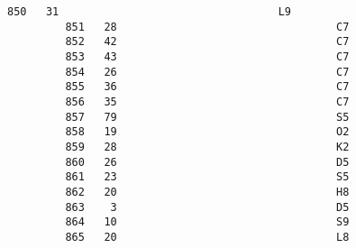 \documentclass[11pt]{article}
\begin{document}
\begin{Verbatim}[commandchars=\\\{\}]
         850   31                                  L9   
         851   28                                  C7   
         852   42                                  C7   
         853   43                                  C7   
         854   26                                  C7   
         855   36                                  C7   
         856   35                                  C7   
         857   79                                  S5   
         858   19                                  O2   
         859   28                                  K2   
         860   26                                  D5   
         861   23                                  S5   
         862   20                                  H8   
         863    3                                  D5   
         864   10                                  S9   
         865   20                                  L8   
         

\end{Verbatim}
\end{document}
